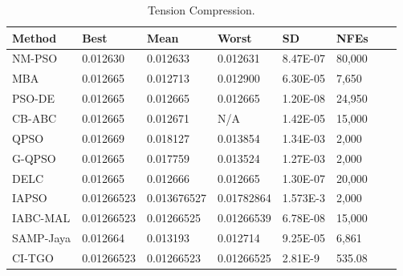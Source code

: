 
\begin{table*}[tp]
    \tiny
\begin{center}

\begin{tabular}{ P{2.0cm} P{2.0cm} P{2.0cm} P{2.0cm} P{2.0cm} P{2.0cm} P{2.0cm} P{2.0cm}  }
\hline
\textbf{Method} & \textbf{Best} & \textbf{Mean} & \textbf{Worst} & \textbf{SD} & \textbf{NFEs} \\
\hline

NM-PSO & 0.012630 & 0.012633 & 0.012631 & 8.47E-07 & 80,000 \\
MBA & 0.012665 & 0.012713 & 0.012900 & 6.30E-05 & 7,650 \\
PSO-DE & 0.012665 & 0.012665 & 0.012665 & 1.20E-08 & 24,950 \\
CB-ABC & 0.012665 & 0.012671 & N/A & 1.42E-05 & 15,000 \\
QPSO & 0.012669 & 0.018127 & 0.013854 & 1.34E-03 & 2,000 \\
G-QPSO & 0.012665 & 0.017759 & 0.013524 & 1.27E-03 & 2,000 \\
DELC & 0.012665 & 0.012666 & 0.012665 & 1.30E-07 & 20,000 \\
IAPSO & 0.01266523 & 0.013676527 & 0.01782864 & 1.573E-3 & 2,000 \\
IABC-MAL & 0.01266523 & 0.01266525 & 0.01266539 & 6.78E-08 & 15,000 \\
SAMP-Jaya & 0.012664 & 0.013193 & 0.012714 & 9.25E-05 & 6,861 \\
CI-TGO & 0.01266523 & 0.01266523 & 0.01266525 & 2.81E-9 & 535.08 \\

\hline
\end{tabular}
\end{center}

\caption{ Tension Compression. \\[1em]}
\label{tab:TC}
\end{table*}

